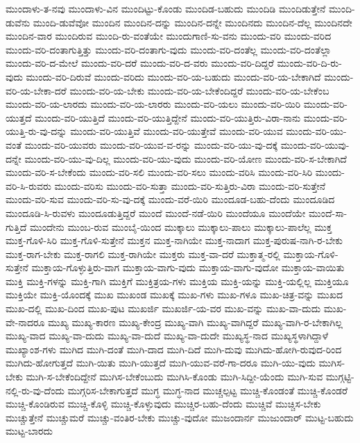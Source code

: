 {ಮುಂದಾಳು-ತ-ನವು
ಮುಂದಾಳು-ವಿನ
ಮುಂದಿಟ್ಟು-ಕೊಂಡು
ಮುಂದಿಡ-ಬಹುದು
ಮುಂದಿಡಿ
ಮುಂದಿಡುತ್ತೇನೆ
ಮುಂದಿ-ಡುವೆನು
ಮುಂದಿ-ಡುವೆವೋ
ಮುಂದಿನ
ಮುಂದಿನ-ದನ್ನು
ಮುಂದಿನ-ದನ್ನೇ
ಮುಂದಿನದು
ಮುಂದಿನ-ದೆಲ್ಲ
ಮುಂದಿನದೇ
ಮುಂದಿನ-ವಾರ
ಮುಂದಿರುವ
ಮುಂದಿ-ರು-ವಂತೆಯೇ
ಮುಂದುಗಾಣಿ-ಸು-ವನು
ಮುಂದು-ವರಿ
ಮುಂದು-ವರಿದ
ಮುಂದು-ವರಿ-ದಂತಾಗುತ್ತಿತ್ತು
ಮುಂದು-ವರಿ-ದಂತಾಗು-ವುದು
ಮುಂದು-ವರಿ-ದಂತೆಲ್ಲ
ಮುಂದು-ವರಿ-ದಂತೆಲ್ಲಾ
ಮುಂದು-ವರಿ-ದ-ಮೇಲೆ
ಮುಂದು-ವರಿ-ದರೆ
ಮುಂದು-ವರಿ-ದ-ವರು
ಮುಂದು-ವರಿ-ದಿದ್ದರೆ
ಮುಂದು-ವರಿ-ದಿ-ರು-ವುದು
ಮುಂದು-ವರಿ-ದಿರುವೆ
ಮುಂದು-ವರಿದು
ಮುಂದು-ವರಿ-ಯ-ಬಹುದು
ಮುಂದು-ವರಿ-ಯ-ಬೇಕಾಗಿದೆ
ಮುಂದು-ವರಿ-ಯ-ಬೇಕಾ-ದರೆ
ಮುಂದು-ವರಿ-ಯ-ಬೇಕು
ಮುಂದು-ವರಿ-ಯ-ಬೇಕೆಂದಿದ್ದರೆ
ಮುಂದು-ವರಿ-ಯ-ಬೇಕೆಂಬ
ಮುಂದು-ವರಿ-ಯ-ಲಾರದು
ಮುಂದು-ವರಿ-ಯ-ಲಾರರು
ಮುಂದು-ವರಿ-ಯಲು
ಮುಂದು-ವರಿ-ಯಿರಿ
ಮುಂದು-ವರಿ-ಯುತ್ತದೆ
ಮುಂದು-ವರಿ-ಯುತ್ತಿದೆ
ಮುಂದು-ವರಿ-ಯುತ್ತಿದ್ದೇನೆ
ಮುಂದು-ವರಿ-ಯುತ್ತಿರು-ವಿರಾ-ನಾನು
ಮುಂದು-ವರಿ-ಯುತ್ತಿ-ರು-ವು-ದನ್ನು
ಮುಂದು-ವರಿ-ಯುತ್ತಿವೆ
ಮುಂದು-ವರಿ-ಯುತ್ತೇವೆ
ಮುಂದು-ವರಿ-ಯುವ
ಮುಂದು-ವರಿ-ಯು-ವಂತೆ
ಮುಂದು-ವರಿ-ಯುವರು
ಮುಂದು-ವರಿ-ಯುವ-ವ-ರನ್ನು
ಮುಂದು-ವರಿ-ಯು-ವು-ದಕ್ಕೆ
ಮುಂದು-ವರಿ-ಯುವು-ದನ್ನೇ
ಮುಂದು-ವರಿ-ಯು-ವು-ದಿಲ್ಲ
ಮುಂದು-ವರಿ-ಯು-ವುದು
ಮುಂದು-ವರಿ-ಯೋಣ
ಮುಂದು-ವರಿ-ಸ-ಬೇಕಾಗಿದೆ
ಮುಂದು-ವರಿ-ಸ-ಬೇಕೆಂದು
ಮುಂದು-ವರಿ-ಸಲಿ
ಮುಂದು-ವರಿ-ಸಲು
ಮುಂದು-ವರಿಸಿ
ಮುಂದು-ವರಿ-ಸಿರಿ
ಮುಂದು-ವರಿ-ಸಿ-ರುವರು
ಮುಂದು-ವರಿಸು
ಮುಂದು-ವರಿ-ಸುತ್ತಾ
ಮುಂದು-ವರಿ-ಸುತ್ತಿರು-ವಿರಾ
ಮುಂದು-ವರಿ-ಸುತ್ತೇನೆ
ಮುಂದು-ವರಿ-ಸುವ
ಮುಂದು-ವರಿ-ಸು-ವು-ದಕ್ಕೆ
ಮುಂದು-ವರೆ-ಯಿರಿ
ಮುಂದೂಡ-ಬಹು-ದೆಂದು
ಮುಂದೂಡಿದ
ಮುಂದೂಡಿ-ಸಿ-ರುವಳು
ಮುಂದೂಡುತ್ತಿದ್ದರೆ
ಮುಂದೆ
ಮುಂದೆ-ನಡೆ-ಯಿರಿ
ಮುಂದೆಯೂ
ಮುಂದೆಯೇ
ಮುಂದೆ-ಸಾ-ಗುತ್ತಿದೆ
ಮುಂದೇನು
ಮುಂಬ-ರುವ
ಮುಂಬೈ-ಯಿಂದ
ಮುಕ್ಕಾಲು
ಮುಕ್ಕಾಲು-ಪಾಲು
ಮುಕ್ಕಾಲು-ಪಾಲೆಲ್ಲ
ಮುಕ್ತ
ಮುಕ್ತ-ಗೊಳಿ-ಸಿರಿ
ಮುಕ್ತ-ಗೊಳಿ-ಸುತ್ತೇನೆ
ಮುಕ್ತನ
ಮುಕ್ತ-ನಾಗಿಯೇ
ಮುಕ್ತ-ನಾದಾಗ
ಮುಕ್ತ-ಪುರುಷ-ನಾಗಿ-ರ-ಬೇಕು
ಮುಕ್ತ-ರಾಗ-ಬೇಕು
ಮುಕ್ತ-ರಾಗಲಿ
ಮುಕ್ತ-ರಾಗಿಯೇ
ಮುಕ್ತರು
ಮುಕ್ತ-ವಾ-ದರೆ
ಮುಕ್ತಾತ್ಮ-ರಲ್ಲಿ
ಮುಕ್ತಾಯ-ಗೊಳಿ-ಸುತ್ತೇನೆ
ಮುಕ್ತಾಯ-ಗೊಳ್ಳುತ್ತಿರು-ವಾಗ
ಮುಕ್ತಾಯ-ವಾಗು-ವುದು
ಮುಕ್ತಾಯ-ವಾಗು-ವುದೋ
ಮುಕ್ತಾಯ-ವಾಯಿತು
ಮುಕ್ತಿ
ಮುಕ್ತಿ-ಗಳನ್ನು
ಮುಕ್ತಿ-ಗಾಗಿ
ಮುಕ್ತಿಗೆ
ಮುಕ್ತಿತ್ರಯ-ಗಳು
ಮುಕ್ತಿಯ
ಮುಕ್ತಿ-ಯನ್ನು
ಮುಕ್ತಿ-ಯಲ್ಲಿಲ್ಲ
ಮುಕ್ತಿಯೂ
ಮುಕ್ತಿಯೇ
ಮುಕ್ತಿ-ಯೊಂದಕ್ಕೆ
ಮುಖ
ಮುಖಂಡ
ಮುಖಕ್ಕೆ
ಮುಖ-ಗಳು
ಮುಖ-ಗಳೂ
ಮುಖ-ಚಿತ್ರ-ವನ್ನು
ಮುಖದ
ಮುಖ-ದಲ್ಲಿ
ಮುಖ-ದಿಂದ
ಮುಖ-ಪುಟ
ಮುಖರ್ಜಿ
ಮುಖರ್ಜಿ-ಯ-ವರ
ಮುಖ-ವನ್ನು
ಮುಖ-ವಾ-ದುದು
ಮುಖ-ವೇ-ನಾದರೂ
ಮುಖ್ಯ
ಮುಖ್ಯ-ಕಾರಣ
ಮುಖ್ಯ-ಕೇಂದ್ರ
ಮುಖ್ಯ-ವಾಗಿ
ಮುಖ್ಯ-ವಾಗಿದ್ದರೆ
ಮುಖ್ಯ-ವಾಗಿ-ರ-ಬೇಕಾಗಿಲ್ಲ
ಮುಖ್ಯ-ವಾದ
ಮುಖ್ಯ-ವಾ-ದುದು
ಮುಖ್ಯ-ವಾ-ದುದೆ
ಮುಖ್ಯ-ವಾ-ದುದೇ
ಮುಖ್ಯಸ್ಥ-ನಾದ
ಮುಖ್ಯಸ್ಥಳಾಗಿದ್ದಾಳೆ
ಮುಖ್ಯಾಂಶ-ಗಳು
ಮುಗಿದ
ಮುಗಿ-ದಂತೆ
ಮುಗಿ-ದಾದ
ಮುಗಿ-ದಿದೆ
ಮುಗಿ-ದುವು
ಮುಗಿದು-ಹೋಗಿ-ರುವುದ-ರಿಂದ
ಮುಗಿದು-ಹೋಗುತ್ತದೆ
ಮುಗಿ-ಯಿತು
ಮುಗಿ-ಯುತ್ತದೆ
ಮುಗಿ-ಯುವ-ವರೆ-ಗಾ-ದರೂ
ಮುಗಿ-ಯು-ವುದು
ಮುಗಿಸ-ಬೇಕು
ಮುಗಿ-ಸ-ಬೇಕೆಂದಿದ್ದೇನೆ
ಮುಗಿಸ-ಬೇಕೆಂಬುದು
ಮುಗಿಸಿ-ಕೊಂಡು
ಮುಗಿ-ಸಿದ್ದೀ-ಯೆಂದು
ಮುಗಿ-ಸುವ
ಮುಗ್ಗಟ್ಟಿ-ನಲ್ಲಿ-ರು-ವು-ದೆಂದು
ಮುಗ್ಗರಿಸ-ಬೇಕಾಗುತ್ತದೆ
ಮುಗ್ಧ
ಮುಗ್ಧ-ನಾದ
ಮುಚ್ಚಲ್ಪಟ್ಟ
ಮುಚ್ಚಿ-ಕೊಂಡಂತೆ
ಮುಚ್ಚಿ-ಕೊಂಡರೆ
ಮುಚ್ಚಿ-ಕೊಂಡಿರುವ
ಮುಚ್ಚಿ-ಕೊಳ್ಳಿ
ಮುಚ್ಚಿ-ಕೊಳ್ಳುವುದು
ಮುಚ್ಚಿರ-ಬಹು-ದೆಂದು
ಮುಚ್ಚಿವೆ
ಮುಚ್ಚಿಸ-ಬೇಕು
ಮುಚ್ಚುತ್ತೇನೆ
ಮುಚ್ಚುಮರೆ
ಮುಚ್ಚು-ವಂತಿರ-ಬೇಕು
ಮುಚ್ಚು-ವುದೋ
ಮುಜಂದಾರ್ನ
ಮುಜುಂದಾರ್
ಮುಟ್ಟ-ಬಹುದು
ಮುಟ್ಟ-ಬಾರದು
}
